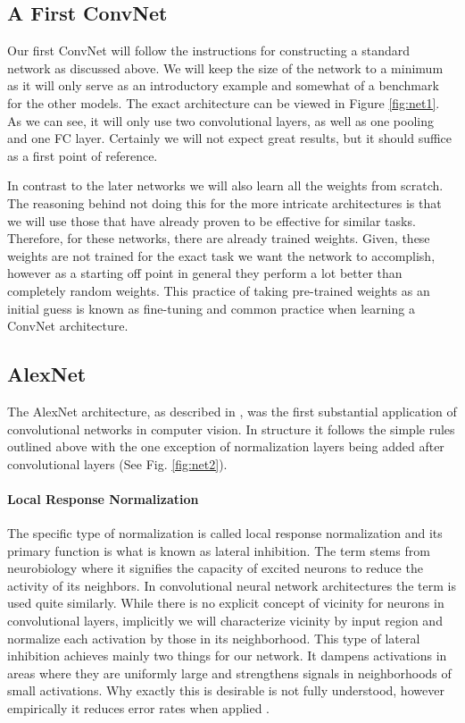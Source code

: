 \documentclass[preprint,12pt,3p]{elsarticle}
\begin{document}
\subsection{A First ConvNet}

Our first ConvNet will follow the instructions for constructing a standard network as discussed above. We will keep the size of the network to a minimum as it will only serve as an introductory example and somewhat of a benchmark for the other models. The exact architecture can be viewed in Figure \ref{fig:net1}. As we can see, it will only use two convolutional layers, as well as one pooling and one FC layer. Certainly we will not expect great results, but it should suffice as a first point of reference. 

In contrast to the later networks we will also learn all the weights from scratch. The reasoning behind not doing this for the more intricate architectures is that we will use those that have already proven to be effective for similar tasks. Therefore, for these networks, there are already trained weights. Given, these weights are not trained for the exact task we want the network to accomplish, however as a starting off point in general they perform a lot better than completely random weights. This practice of taking pre-trained weights as an initial guess is known as fine-tuning and common practice when learning a ConvNet architecture.

\subsection{AlexNet}

The AlexNet architecture, as described in \cite{krizhevsky2012imagenet}, was the first substantial application of convolutional networks in computer vision. In structure it follows the simple rules outlined above with the one exception of normalization layers being added after convolutional layers (See Fig. \ref{fig:net2}).

\paragraph{Local Response Normalization}
The specific type of normalization is called local response normalization and its primary function is what is known as lateral inhibition. The term stems from neurobiology where it signifies the capacity of excited neurons to reduce the activity of its neighbors. In convolutional neural network architectures the term is used quite similarly. While there is no explicit concept of vicinity for neurons in convolutional layers, implicitly we will characterize vicinity by input region and normalize each activation by those in its neighborhood. This type of lateral inhibition achieves mainly two things for our network. It dampens activations in areas where they are uniformly large and strengthens signals in neighborhoods of small activations. Why exactly this is desirable is not fully understood, however empirically it reduces error rates when applied \cite{krizhevsky2012imagenet}.
\end{document}
